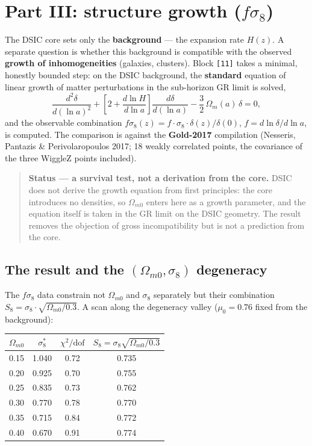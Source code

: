 \documentclass[a4paper,10pt]{article}
\begin{document}
\section{Part III: structure growth ($f\sigma_8$)}

The DSIC core sets only the \textbf{background} --- the expansion rate $H(z)$. A separate question is whether this background is compatible with the observed \textbf{growth of inhomogeneities} (galaxies, clusters). Block \texttt{[11]} takes a minimal, honestly bounded step: on the DSIC background, the \textbf{standard} equation of linear growth of matter perturbations in the sub-horizon GR limit is solved,
\begin{equation}
\frac{d^2\delta}{d(\ln a)^2} + \left[2 + \frac{d\ln H}{d\ln a}\right]\frac{d\delta}{d(\ln a)} - \frac{3}{2}\,\Omega_m(a)\,\delta = 0,
\end{equation}
and the observable combination $f\sigma_8(z) = f\cdot\sigma_8\cdot\delta(z)/\delta(0)$, $f = d\ln\delta/d\ln a$, is computed. The comparison is against the \textbf{Gold-2017} compilation (Nesseris, Pantazis \& Perivolaropoulos 2017; 18 weakly correlated points, the covariance of the three WiggleZ points included).

\begin{quote}
\textbf{Status --- a survival test, not a derivation from the core.} DSIC does not derive the growth equation from first principles: the core introduces no densities, so $\Omega_{m0}$ enters here as a growth parameter, and the equation itself is taken in the GR limit on the DSIC geometry. The result removes the objection of gross incompatibility but is not a prediction from the core.
\end{quote}

\subsection{The result and the $(\Omega_{m0}, \sigma_8)$ degeneracy}

The $f\sigma_8$ data constrain not $\Omega_{m0}$ and $\sigma_8$ separately but their combination $S_8 = \sigma_8\cdot\sqrt{\Omega_{m0}/0.3}$. A scan along the degeneracy valley ($\mu_0 = 0.76$ fixed from the background):

\begin{table}[htbp]
\centering
\small
\begin{tabular}{@{}cccc@{}}
\toprule
$\Omega_{m0}$ & $\sigma_8^*$ & $\chi^2/\text{dof}$ & $S_8 = \sigma_8\sqrt{\Omega_{m0}/0.3}$ \\
\midrule
0.15 & 1.040 & 0.72 & 0.735 \\
0.20 & 0.925 & 0.70 & 0.755 \\
0.25 & 0.835 & 0.73 & 0.762 \\
0.30 & 0.770 & 0.78 & 0.770 \\
0.35 & 0.715 & 0.84 & 0.772 \\
0.40 & 0.670 & 0.91 & 0.774 \\
\bottomrule
\end{tabular}
\end{table}
\end{document}
